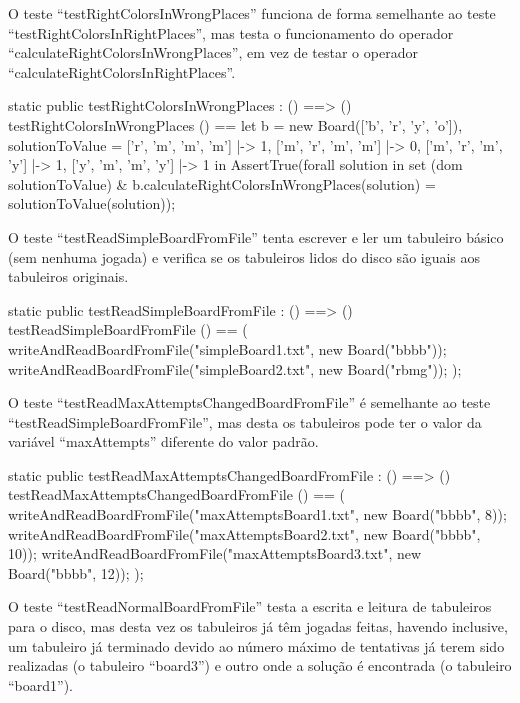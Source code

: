 O teste ``testRightColorsInWrongPlaces'' funciona de forma semelhante
ao teste ``testRightColorsInRightPlaces'', mas testa o funcionamento
do operador ``calculateRightColorsInWrongPlaces'', em vez de testar o
operador ``calculateRightColorsInRightPlaces''.

\begin{vdm_al}
    static public testRightColorsInWrongPlaces : () ==> ()
    testRightColorsInWrongPlaces () ==
      let b = new Board(['b', 'r', 'y', 'o']),
        solutionToValue = {
          ['r', 'm', 'm', 'm'] |-> 1,
          ['m', 'r', 'm', 'm'] |-> 0,
          ['m', 'r', 'm', 'y'] |-> 1,
          ['y', 'm', 'm', 'y'] |-> 1
        } in
        AssertTrue(forall solution in set (dom solutionToValue)
          & b.calculateRightColorsInWrongPlaces(solution) = solutionToValue(solution));
\end{vdm_al}  
 
O teste ``testReadSimpleBoardFromFile'' tenta escrever e ler um
tabuleiro básico (sem nenhuma jogada) e verifica se os tabuleiros
lidos do disco são iguais aos tabuleiros originais.

\begin{vdm_al} 
    static public testReadSimpleBoardFromFile : () ==> ()
    testReadSimpleBoardFromFile () == (
      writeAndReadBoardFromFile("simpleBoard1.txt", new Board("bbbb"));
      writeAndReadBoardFromFile("simpleBoard2.txt", new Board("rbmg"));
    );
\end{vdm_al}

O teste ``testReadMaxAttemptsChangedBoardFromFile'' é semelhante ao
teste ``testReadSimpleBoardFromFile'', mas desta os tabuleiros pode
ter o valor da variável ``maxAttempts'' diferente do valor padrão.

\begin{vdm_al}  
    static public testReadMaxAttemptsChangedBoardFromFile : () ==> ()
    testReadMaxAttemptsChangedBoardFromFile () == (
      writeAndReadBoardFromFile("maxAttemptsBoard1.txt", new Board("bbbb", 8));
      writeAndReadBoardFromFile("maxAttemptsBoard2.txt", new Board("bbbb", 10));
      writeAndReadBoardFromFile("maxAttemptsBoard3.txt", new Board("bbbb", 12));
    );
\end{vdm_al}

O teste ``testReadNormalBoardFromFile'' testa a escrita e leitura de
tabuleiros para o disco, mas desta vez os tabuleiros já têm jogadas
feitas, havendo inclusive, um tabuleiro já terminado devido ao número
máximo de tentativas já terem sido realizadas (o tabuleiro ``board3'')
e outro onde a solução é encontrada (o tabuleiro ``board1'').

